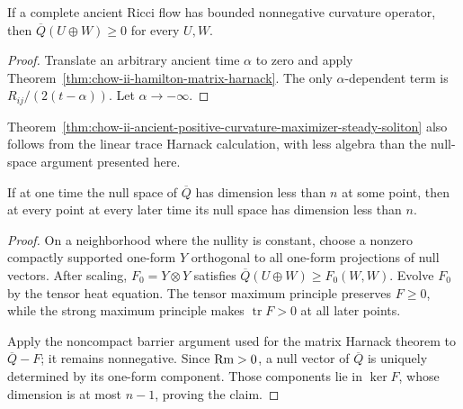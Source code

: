 \begin{corollary}
\label{cor:chow-ii-ancient-matrix-harnack}


If a complete ancient Ricci flow has bounded nonnegative curvature operator,
then \(\overline Q(U\oplus W)\ge0\) for every \(U,W\).
\end{corollary}
\begin{proof}
\sketch Translate an arbitrary ancient time \(\alpha\) to zero and apply
Theorem~\ref{thm:chow-ii-hamilton-matrix-harnack}.  The only
\(\alpha\)-dependent term is \(R_{ij}/(2(t-\alpha))\).  Let
\(\alpha\to-\infty\).
\end{proof}

\begin{remark}
\label{rem:chow-ii-alternative-ancient-rigidity-proof}

Theorem~\ref{thm:chow-ii-ancient-positive-curvature-maximizer-steady-soliton}
also follows from the linear trace Harnack calculation, with less algebra than
the null-space argument presented here.
\end{remark}

\begin{lemma}
\label{lem:chow-ii-ancient-harnack-nullspace-propagation}


If at one time the null space of \(\overline Q\) has dimension less than
\(n\) at some point, then at every point at every later time its null space
has dimension less than \(n\).
\end{lemma}
\begin{proof}
\sketch On a neighborhood where the nullity is constant, choose a nonzero compactly
supported one-form \(Y\) orthogonal to all one-form projections of null
vectors.  After scaling, \(F_0=Y\otimes Y\) satisfies
\(\overline Q(U\oplus W)\ge F_0(W,W)\).  Evolve \(F_0\) by the tensor heat
equation.  The tensor maximum principle preserves \(F\ge0\), while the strong
maximum principle makes \(\operatorname{tr}F>0\) at all later points.

Apply the noncompact barrier argument used for the matrix Harnack theorem to
\(\overline Q-F\); it remains nonnegative.  Since \(\operatorname{Rm}>0\), a null vector
of \(\overline Q\) is uniquely determined by its one-form component.  Those
components lie in \(\ker F\), whose dimension is at most \(n-1\), proving the
claim.
\end{proof}

